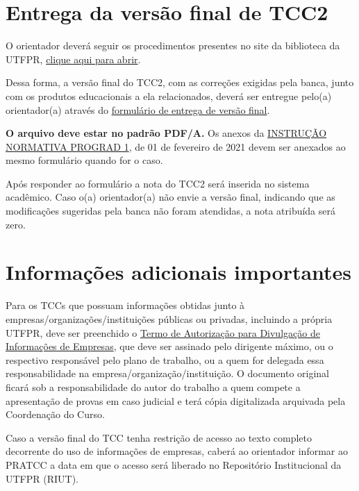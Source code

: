 \documentclass[a4paper, 12pt]{article}
\begin{document}
	\section{Entrega da versão final de TCC2}
	
	O orientador deverá seguir os procedimentos presentes no site da biblioteca da UTFPR, \href{http://portal.utfpr.edu.br/biblioteca/trabalhos-academicos/docentes/procedimento-de-entrega-graduacao}{clique aqui para abrir}.
	
	Dessa forma, a versão final do TCC2, com as correções exigidas pela banca, junto com os produtos educacionais a ela relacionados, deverá ser entregue pelo(a) orientador(a) através do \href{https://forms.gle/LScHkAtDPReTjki46}{formulário de entrega de versão final}. 
	
	\textbf{O arquivo deve estar no padrão PDF/A.} Os anexos da \href{https://sei.utfpr.edu.br/sei/publicacoes/controlador_publicacoes.php?acao=publicacao_visualizar&id_documento=2042165&id_orgao_publicacao=0}{INSTRUÇÃO NORMATIVA PROGRAD 1}, de 01 de fevereiro de 2021 devem ser anexados ao mesmo formulário quando for o caso. 
		
	Após responder ao formulário a nota do TCC2 será inserida no sistema acadêmico. Caso o(a) orientador(a) não envie a versão final, indicando que as modificações sugeridas pela banca não foram atendidas, a nota atribuída será zero.	
		
	\section{Informações adicionais importantes}
	
	Para os TCCs que possuam informações obtidas junto à empresas/organizações/instituições públicas ou privadas, incluindo a própria UTFPR, deve ser preenchido o \href{https://sei.utfpr.edu.br/sei/publicacoes/controlador_publicacoes.php?acao=publicacao_visualizar&id_documento=2651593&id_orgao_publicacao=0}{Termo de Autorização para Divulgação de Informações de Empresas}, que deve ser assinado pelo dirigente máximo, ou o respectivo responsável pelo plano de trabalho, ou a quem for delegada essa responsabilidade na empresa/organização/instituição. O documento original ficará sob a responsabilidade do autor do trabalho a quem compete a apresentação de provas em caso judicial e terá cópia digitalizada arquivada pela Coordenação do Curso.

	Caso a versão final do TCC tenha restrição de acesso ao texto completo decorrente do uso de informações de empresas, caberá ao orientador informar ao PRATCC a data em que o acesso será liberado no Repositório Institucional da UTFPR (RIUT).
	
	
\end{document}
